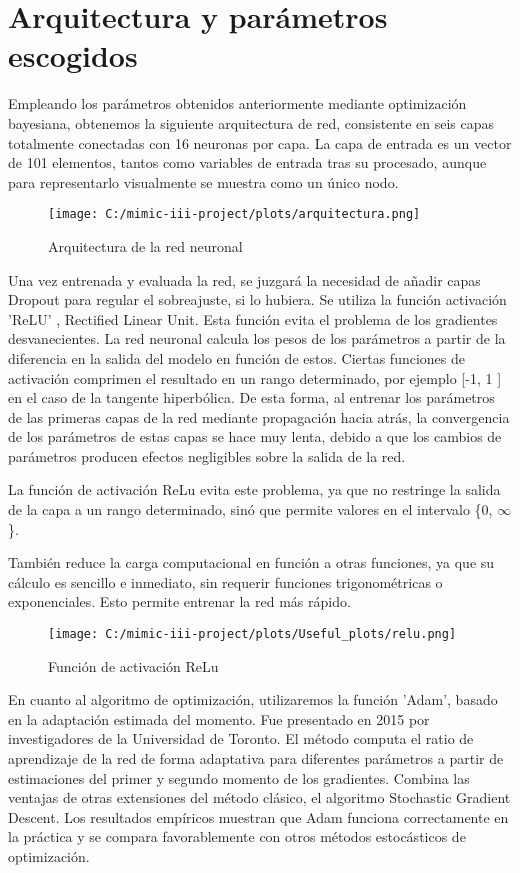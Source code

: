 \documentclass{report}
\begin{document}
\section{Arquitectura y parámetros escogidos}

Empleando los parámetros obtenidos anteriormente mediante optimización bayesiana, obtenemos la siguiente arquitectura de red, consistente en seis capas totalmente conectadas con 16 neuronas por capa. La capa de entrada es un vector de 101 elementos, tantos como variables de entrada tras su procesado, aunque para representarlo visualmente se muestra como un único nodo. 

\begin{figure}[h]
\centering
\texttt{[image: C:/mimic-iii-project/plots/arquitectura.png]}
\caption{Arquitectura de la red neuronal}
\end{figure}
Una vez entrenada y evaluada la red, se juzgará la necesidad de añadir
capas Dropout para regular el sobreajuste, si lo hubiera.
Se utiliza la función activación 'ReLU' , Rectified Linear Unit. Esta
función evita el problema de los gradientes desvanecientes. La red
neuronal calcula los pesos de los parámetros a partir de la diferencia
en la salida del modelo en función de estos. Ciertas funciones de
activación comprimen el resultado en un rango determinado, por ejemplo
{[}-1, 1 {]} en el caso de la tangente hiperbólica. De esta forma, al
entrenar los parámetros de las primeras capas de la red mediante
propagación hacia atrás, la convergencia de los parámetros de estas
capas se hace muy lenta, debido a que los cambios de parámetros producen
efectos negligibles sobre la salida de la red.

La función de activación ReLu evita este problema, ya que no restringe
la salida de la capa a un rango determinado, sinó que permite valores en
el intervalo \{0, $\infty$\}.

También reduce la carga computacional en función a otras funciones, ya
que su cálculo es sencillo e inmediato, sin requerir funciones
trigonométricas o exponenciales. Esto permite entrenar la red más
rápido.
\begin{figure}[H]
\centering
\texttt{[image: C:/mimic-iii-project/plots/Useful\_plots/relu.png]}
\caption{Función de activación ReLu}
\end{figure}
En cuanto al algoritmo de optimización, utilizaremos la función 'Adam',
basado en la adaptación estimada del momento. Fue presentado en 2015 por
investigadores de la Universidad de Toronto. El método computa el ratio
de aprendizaje de la red de forma adaptativa para diferentes parámetros
a partir de estimaciones del primer y segundo momento de los gradientes.
Combina las ventajas de otras extensiones del método clásico, el
algoritmo Stochastic Gradient Descent. Los resultados empíricos muestran
que Adam funciona correctamente en la práctica y se compara
favorablemente con otros métodos estocásticos de optimización.
\end{document}
